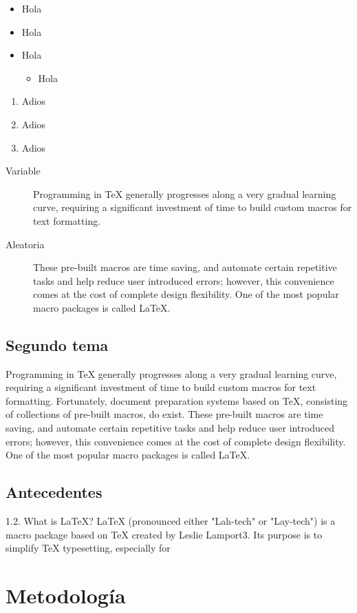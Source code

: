 \documentclass[a4paper,12pt]{article}
\begin{document}
\begin{itemize}
    \item[a.] Hola
    \item[] Hola
    \item Hola
    \begin{itemize}
        \item Hola
    \end{itemize}
\end{itemize}
\begin{enumerate}
    \item Adios
    \item Adios
    \item Adios
\end{enumerate}
\begin{description}
\item[Variable] Programming in TeX generally progresses along a very gradual learning curve, requiring
a significant investment of time to build custom macros for text formatting.
\item[Aleatoria] These pre-built macros are time saving, and automate certain repetitive tasks and
help reduce user introduced errors; however, this convenience comes at the cost of complete
design flexibility. One of the most popular macro packages is called LaTeX.
\end{description}


\subsection{Segundo tema}
Programming in TeX generally progresses along a very gradual learning curve, requiring
a significant investment of time to build custom macros for text formatting. Fortunately,
document preparation systems based on TeX, consisting of collections of pre-built macros,
do exist. These pre-built macros are time saving, and automate certain repetitive tasks and
help reduce user introduced errors; however, this convenience comes at the cost of complete
design flexibility. One of the most popular macro packages is called LaTeX.

\subsection{Antecedentes}
1.2. What is LaTeX?
LaTeX (pronounced either "Lah-tech" or "Lay-tech") is a macro package based on TeX
created by Leslie Lamport3. Its purpose is to simplify TeX typesetting, especially for

\section*{Metodología}
\end{document}
